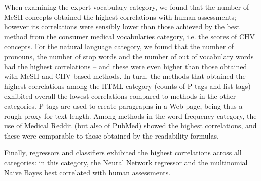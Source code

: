 When examining the expert vocabulary category, we found that the number of MeSH concepts obtained the highest correlations with human assessments; however its correlations were sensibly lower than those achieved by the best method from the consumer medical vocabularies category, i.e. the scores of CHV concepts. For the natural language category, we found that the number of pronouns, the number of stop words and the number of out of vocabulary words had the highest correlations -- and these were even higher than those obtained with MeSH and CHV based methods. In turn, the methods that obtained the highest correlations among the HTML category (counts of P tags and list tags) exhibited overall the lowest correlations compared to methods in the other categories. P tags are used to create paragraphs in a Web page, being thus a rough proxy for text length. 
Among methods in the word frequency category, the use of Medical Reddit (but also of PubMed) showed the highest correlations, and these were comparable to those obtained by the readability formulas. 



Finally, regressors and classifiers exhibited the highest correlations across all categories: in this  category, the  Neural Network regressor and the multinomial Naive Bayes best correlated with human assessments. %



%

%


